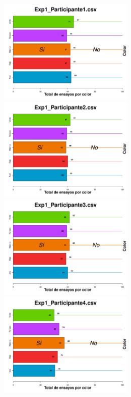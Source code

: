 \documentclass[a4paper ]{article}
\begin{document}
\begin{figure}[th]
\centering
\includegraphics[width=9cm, height=5cm]{Figures/BiasColor_Exp1_P1} \includegraphics[width=9cm, height=5cm]{Figures/BiasColor_Exp1_P2} 
\includegraphics[width=9cm, height=5cm]{Figures/BiasColor_Exp1_P3} \includegraphics[width=9cm, height=5cm]{Figures/BiasColor_Exp1_P4} 

\end{figure}
\end{document}
